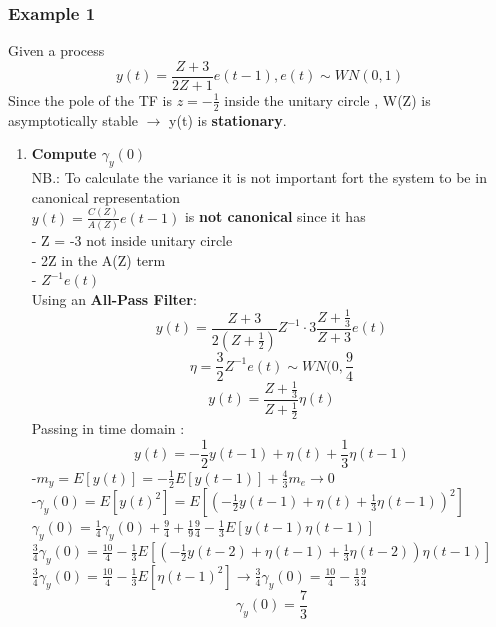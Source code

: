\subsubsection{Example 1}
Given a process $$ y(t)= \frac{Z+3}{2Z+1} e(t-1) , e(t) \sim WN(0,1)$$
Since the pole of the TF is $z=-\frac{1}{2}$ inside the unitary circle ,  W(Z) is asymptotically stable $\to$ y(t) is \textbf{stationary}.\\
\begin{enumerate}

\item \textbf{Compute $\gamma_y(0)$}\\
NB.: To calculate the variance it is not important fort the system to be in canonical representation\\
$y(t) = \frac{C(Z)}{A(Z)}e(t-1) $ is \textbf{not canonical} since it has \\
- Z = -3 not inside unitary circle\\
- 2Z in the A(Z) term\\
- $Z^{-1}e(t)$\\
Using an \textbf{All-Pass Filter}: 
$$ y(t) = \frac{Z+3}{2(Z+\frac{1}{2})} Z^{-1} \cdot 3 \frac{Z+\frac{1}{3}}{Z+3}e(t)$$
$$ \eta = \frac{3}{2}Z^{-1}e(t) \sim WN(0,\frac{9}{4}$$
$$ y(t) = \frac{Z+\frac{1}{3}}{Z+\frac{1}{2}}\eta(t)$$
Passing in time domain : $$ y(t)= -\frac{1}{2}y(t-1)+\eta(t) +\frac{1}{3}\eta(t-1)$$
-$m_y = E[y(t)]= -\frac{1}{2}E[y(t-1)]+\frac{4}{3}m_e \to 0$\\
-$\gamma_y(0) = E[y(t)^2] = E[(-\frac{1}{2}y(t-1) + \eta(t) + \frac{1}{3}\eta(t-1))^2]$\\
  $\gamma_y(0) = \frac{1}{4}\gamma_y(0) + \frac{9}{4} + \frac{1}{9}\frac{9}{4} - \frac{1}{3}E[y(t-1)\eta(t-1)]$\\
  $\frac{3}{4}\gamma_y(0) =\frac{10}{4} - \frac{1}{3}E[(-\frac{1}{2}y(t-2)+\eta(t-1)+\frac{1}{3}\eta(t-2))\eta(t-1)] $\\
  $\frac{3}{4}\gamma_y(0) = \frac{10}{4} -\frac{1}{3}E[\eta(t-1)^2] \to \frac{3}{4}\gamma_y(0) = \frac{10}{4} -\frac{1}{3}\frac{9}{4}$
 \[
 \boxed{\gamma_y(0)=\frac{7}{3}}
 \]


\end{enumerate}
